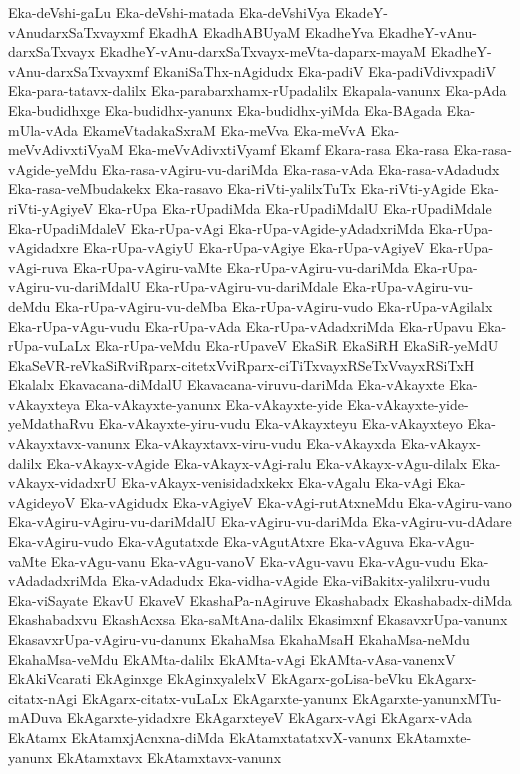 {Eka-deVshi-gaLu
Eka-deVshi-matada
Eka-deVshiVya
EkadeY-vAnudarxSaTxvayxmf
EkadhA
EkadhABUyaM
EkadheYva
EkadheY-vAnu-darxSaTxvayx
EkadheY-vAnu-darxSaTxvayx-meVta-daparx-mayaM
EkadheY-vAnu-darxSaTxvayxmf
EkaniSaThx-nAgidudx
Eka-padiV
Eka-padiVdivxpadiV
Eka-para-tatavx-dalilx
Eka-parabarxhamx-rUpadalilx
Ekapala-vanunx
Eka-pAda
Eka-budidhxge
Eka-budidhx-yanunx
Eka-budidhx-yiMda
Eka-BAgada
Eka-mUla-vAda
EkameVtadakaSxraM
Eka-meVva
Eka-meVvA
Eka-meVvAdivxtiVyaM
Eka-meVvAdivxtiVyamf
Ekamf
Ekara-rasa
Eka-rasa
Eka-rasa-vAgide-yeMdu
Eka-rasa-vAgiru-vu-dariMda
Eka-rasa-vAda
Eka-rasa-vAdadudx
Eka-rasa-veMbudakekx
Eka-rasavo
Eka-riVti-yalilxTuTx
Eka-riVti-yAgide
Eka-riVti-yAgiyeV
Eka-rUpa
Eka-rUpadiMda
Eka-rUpadiMdalU
Eka-rUpadiMdale
Eka-rUpadiMdaleV
Eka-rUpa-vAgi
Eka-rUpa-vAgide-yAdadxriMda
Eka-rUpa-vAgidadxre
Eka-rUpa-vAgiyU
Eka-rUpa-vAgiye
Eka-rUpa-vAgiyeV
Eka-rUpa-vAgi-ruva
Eka-rUpa-vAgiru-vaMte
Eka-rUpa-vAgiru-vu-dariMda
Eka-rUpa-vAgiru-vu-dariMdalU
Eka-rUpa-vAgiru-vu-dariMdale
Eka-rUpa-vAgiru-vu-deMdu
Eka-rUpa-vAgiru-vu-deMba
Eka-rUpa-vAgiru-vudo
Eka-rUpa-vAgilalx
Eka-rUpa-vAgu-vudu
Eka-rUpa-vAda
Eka-rUpa-vAdadxriMda
Eka-rUpavu
Eka-rUpa-vuLaLx
Eka-rUpa-veMdu
Eka-rUpaveV
EkaSiR
EkaSiRH
EkaSiR-yeMdU
EkaSeVR-reVkaSiRviRparx-citetxVviRparx-ciTiTxvayxRSeTxVvayxRSiTxH
Ekalalx
Ekavacana-diMdalU
Ekavacana-viruvu-dariMda
Eka-vAkayxte
Eka-vAkayxteya
Eka-vAkayxte-yanunx
Eka-vAkayxte-yide
Eka-vAkayxte-yide-yeMdathaRvu
Eka-vAkayxte-yiru-vudu
Eka-vAkayxteyu
Eka-vAkayxteyo
Eka-vAkayxtavx-vanunx
Eka-vAkayxtavx-viru-vudu
Eka-vAkayxda
Eka-vAkayx-dalilx
Eka-vAkayx-vAgide
Eka-vAkayx-vAgi-ralu
Eka-vAkayx-vAgu-dilalx
Eka-vAkayx-vidadxrU
Eka-vAkayx-venisidadxkekx
Eka-vAgalu
Eka-vAgi
Eka-vAgideyoV
Eka-vAgidudx
Eka-vAgiyeV
Eka-vAgi-rutAtxneMdu
Eka-vAgiru-vano
Eka-vAgiru-vAgiru-vu-dariMdalU
Eka-vAgiru-vu-dariMda
Eka-vAgiru-vu-dAdare
Eka-vAgiru-vudo
Eka-vAgutatxde
Eka-vAgutAtxre
Eka-vAguva
Eka-vAgu-vaMte
Eka-vAgu-vanu
Eka-vAgu-vanoV
Eka-vAgu-vavu
Eka-vAgu-vudu
Eka-vAdadadxriMda
Eka-vAdadudx
Eka-vidha-vAgide
Eka-viBakitx-yalilxru-vudu
Eka-viSayate
EkavU
EkaveV
EkashaPa-nAgiruve
Ekashabadx
Ekashabadx-diMda
Ekashabadxvu
EkashAcxsa
Eka-saMtAna-dalilx
Ekasimxnf
EkasavxrUpa-vanunx
EkasavxrUpa-vAgiru-vu-danunx
EkahaMsa
EkahaMsaH
EkahaMsa-neMdu
EkahaMsa-veMdu
EkAMta-dalilx
EkAMta-vAgi
EkAMta-vAsa-vanenxV
EkAkiVcarati
EkAginxge
EkAginxyalelxV
EkAgarx-goLisa-beVku
EkAgarx-citatx-nAgi
EkAgarx-citatx-vuLaLx
EkAgarxte-yanunx
EkAgarxte-yanunxMTu-mADuva
EkAgarxte-yidadxre
EkAgarxteyeV
EkAgarx-vAgi
EkAgarx-vAda
EkAtamx
EkAtamxjAcnxna-diMda
EkAtamxtatatxvX-vanunx
EkAtamxte-yanunx
EkAtamxtavx
EkAtamxtavx-vanunx
}
